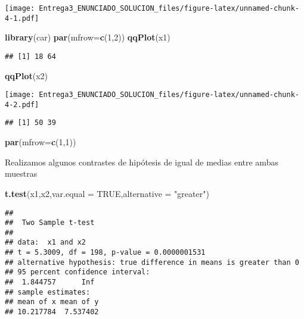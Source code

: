 \documentclass[
]{article}
\newenvironment{Shaded}{\begin{snugshade}}{\end{snugshade}}
\newcommand{\DataTypeTok}[1]{\textcolor[rgb]{0.13,0.29,0.53}{#1}}
\newcommand{\DecValTok}[1]{\textcolor[rgb]{0.00,0.00,0.81}{#1}}
\newcommand{\KeywordTok}[1]{\textcolor[rgb]{0.13,0.29,0.53}{\textbf{#1}}}
\newcommand{\NormalTok}[1]{#1}
\newcommand{\OtherTok}[1]{\textcolor[rgb]{0.56,0.35,0.01}{#1}}
\newcommand{\StringTok}[1]{\textcolor[rgb]{0.31,0.60,0.02}{#1}}
\begin{document}
\texttt{[image: Entrega3\_ENUNCIADO\_SOLUCION\_files/figure-latex/unnamed-chunk-4-1.pdf]}

\begin{Shaded}
\begin{Highlighting}[]
\KeywordTok{library}\NormalTok{(car)}
\KeywordTok{par}\NormalTok{(}\DataTypeTok{mfrow=}\KeywordTok{c}\NormalTok{(}\DecValTok{1}\NormalTok{,}\DecValTok{2}\NormalTok{))}
\KeywordTok{qqPlot}\NormalTok{(x1)}
\end{Highlighting}
\end{Shaded}

\begin{verbatim}
## [1] 18 64
\end{verbatim}

\begin{Shaded}
\begin{Highlighting}[]
\KeywordTok{qqPlot}\NormalTok{(x2)}
\end{Highlighting}
\end{Shaded}

\texttt{[image: Entrega3\_ENUNCIADO\_SOLUCION\_files/figure-latex/unnamed-chunk-4-2.pdf]}

\begin{verbatim}
## [1] 50 39
\end{verbatim}

\begin{Shaded}
\begin{Highlighting}[]
\KeywordTok{par}\NormalTok{(}\DataTypeTok{mfrow=}\KeywordTok{c}\NormalTok{(}\DecValTok{1}\NormalTok{,}\DecValTok{1}\NormalTok{))}
\end{Highlighting}
\end{Shaded}

Realizamos algunos contrastes de hipótesis de igual de medias entre
ambas muestras

\begin{Shaded}
\begin{Highlighting}[]
\KeywordTok{t.test}\NormalTok{(x1,x2,}\DataTypeTok{var.equal =} \OtherTok{TRUE}\NormalTok{,}\DataTypeTok{alternative =} \StringTok{"greater"}\NormalTok{)}
\end{Highlighting}
\end{Shaded}

\begin{verbatim}
## 
##  Two Sample t-test
## 
## data:  x1 and x2
## t = 5.3009, df = 198, p-value = 0.0000001531
## alternative hypothesis: true difference in means is greater than 0
## 95 percent confidence interval:
##  1.844757      Inf
## sample estimates:
## mean of x mean of y 
## 10.217784  7.537402
\end{verbatim}
\end{document}
